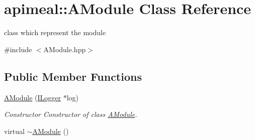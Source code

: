 \hypertarget{classapimeal_1_1AModule}{\section{apimeal\-:\-:A\-Module Class Reference}
\label{classapimeal_1_1AModule}
}


class which represent the module  




{\ttfamily \#include $<$A\-Module.\-hpp$>$}

\subsection*{Public Member Functions}
\begin{DoxyCompactItemize}
\item 
\hyperlink{classapimeal_1_1AModule_af499c09d8c815150cd4ab48947e7325c}{A\-Module} (\hyperlink{classapimeal_1_1ILogger}{I\-Logger} $\ast$log)
\begin{DoxyCompactList}\small\item\em Constructor Constructor of class \hyperlink{classapimeal_1_1AModule}{A\-Module}. \end{DoxyCompactList}\item 
\hypertarget{classapimeal_1_1AModule_adab8d8b39d08162ba4c9bf9e609f243b}{virtual \hyperlink{classapimeal_1_1AModule_adab8d8b39d08162ba4c9bf9e609f243b}{$\sim$\-A\-Module} ()}\label{classapimeal_1_1AModule_adab8d8b39d08162ba4c9bf9e609f243b}


\end{DoxyCompactItemize}
